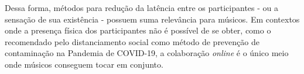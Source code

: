 Dessa forma, métodos para redução da latência entre os participantes - ou a sensação de sua existência - possuem suma relevância para músicos. Em contextos onde a presença física dos participantes não é possível de se obter, como o recomendado pelo distanciamento social como método de prevenção de contaminação na Pandemia de COVID-19, a colaboração \textit{online} é o único meio onde músicos conseguem tocar em conjunto.